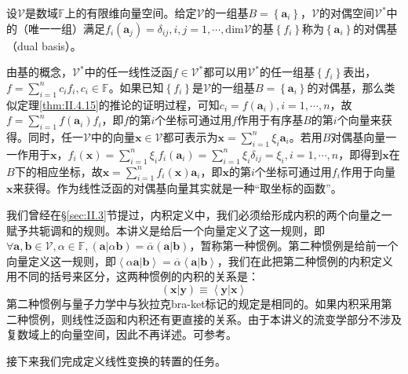 \documentclass[main.tex]{subfiles}
\begin{document}
\begin{definition}[对偶基]\label{def:II.4.5}
设$\mathcal{V}$是数域$\mathbb{F}$上的有限维向量空间。给定$\mathcal{V}$的一组基$B=\left\{\mathbf{a}_i\right\}$，$\mathcal{V}$的对偶空间$\mathcal{V}^*$中的（唯一一组）满足$f_i\left(\mathbf{a}_j\right)=\delta_{ij},i,j=1,\cdots,\mathrm{dim}\mathcal{V}$的基$\left\{f_i\right\}$称为$\left\{\mathbf{a}_i\right\}$的对偶基（dual basis）。
\end{definition}

由基的概念，$\mathcal{V}^*$中的任一线性泛函$f\in\mathcal{V}^*$都可以用$\mathcal{V}^*$的任一组基$\left\{f_i\right\}$表出，$f=\sum_{i=1}^nc_if_i,c_i\in\mathbb{F}$。如果已知$\left\{f_i\right\}$是$\mathcal{V}$的一组基$B=\left\{\mathbf{a}_i\right\}$的对偶基，那么类似定理\ref{thm:II.4.15}的推论的证明过程，可知$c_i=f\left(\mathbf{a}_i\right),i=1,\cdots,n$，故$f=\sum_{i=1}^nf\left(\mathbf{a}_i\right)f_i$，即$f$的第$i$个坐标可通过用$f$作用于有序基$B$的第$i$个向量来获得。同时，任一$\mathcal{V}$中的向量$\mathbf{x}\in\mathcal{V}$都可表示为$\mathbf{x}=\sum_{i=1}^n\xi_i\mathbf{a}_i$。若用$B$对偶基向量一一作用于$\mathbf{x}$，$f_i\left(\mathbf{x}\right)=\sum_{i=1}^n\xi_if_i\left(\mathbf{a}_i\right)=\sum_{i=1}^n\xi_i\delta_{ij}=\xi_i,i=1,\cdots,n$，即得到$\mathbf{x}$在$B$下的相应坐标，故$\mathbf{x}=\sum_{i=1}^nf_i\left(\mathbf{x}\right)\mathbf{a}_i$，即$\mathbf{x}$的第$i$个坐标可通过用$f_i$作用于向量$\mathbf{x}$来获得。作为线性泛函的对偶基向量其实就是一种“取坐标的函数”。

我们曾经在\S\ref{sec:II.3}节提过，内积定义中，我们必须给形成内积的两个向量之一赋予共轭调和的规则。本讲义是给后一个向量定义了这一规则，即$\forall\mathbf{a},\mathbf{b}\in\mathcal{V},\alpha\in\mathbb{F},\left(\mathbf{a}|\alpha\mathbf{b}\right)=\overline{\alpha}\left(\mathbf{a}|\mathbf{b}\right)$，暂称第一种惯例。第二种惯例是给前一个向量定义这一规则，即$\left\langle\alpha\mathbf{a}|\mathbf{b}\right\rangle=\overline{\alpha}\left\langle\mathbf{a}|\mathbf{b}\right\rangle$，我们在此把第二种惯例的内积定义用不同的括号来区分，这两种惯例的内积的关系是：
\[\left(\mathbf{x}|\mathbf{y}\right)\equiv\left\langle\mathbf{y}|\mathbf{x}\right\rangle\]
第二种惯例与量子力学中与狄拉克bra-ket标记的规定是相同的。如果内积采用第二种惯例，则线性泛函和内积还有更直接的关系。由于本讲义的流变学部分不涉及复数域上的向量空间，因此不再详述。可参考\cite[\S1.3.1]{Hassani1999}。

接下来我们完成定义线性变换的转置的任务。
\end{document}
